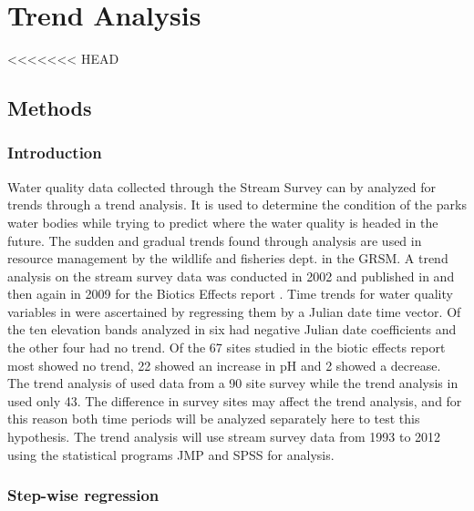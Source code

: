 \chapter{Trend Analysis}\label{ch:TA}
<<<<<<< HEAD

\section{Methods}

\subsection{Introduction}

Water quality data collected through the Stream Survey can by analyzed for trends through a trend analysis.
It is used to determine the condition of the parks water bodies while trying to predict where the water quality is headed in the future. 
The sudden and gradual trends found through analysis are used in resource management by the wildlife and fisheries dept. in the GRSM.
A trend analysis on the stream survey data was conducted in 2002 and published in \citet{robinson2008ph} and then again in 2009 for the Biotics Effects report \citep{cai2012}.
Time trends for water quality variables  in \citet{robinson2008ph} were ascertained by regressing them by a Julian date time vector.
Of the ten elevation bands analyzed in \citet{robinson2008ph} six had negative Julian date coefficients and the other four had no trend. 
Of the 67 sites studied in the biotic effects report most showed no trend, 22 showed an increase in pH and 2 showed a decrease\citep{cai2012}. 
The trend analysis of \citet{robinson2008ph} used data from a 90 site survey while the trend analysis in \citet{cai2012} used only 43.
The difference in survey sites may affect the trend analysis, and for this reason both time periods will be analyzed separately here to test this hypothesis.
The trend analysis will use stream survey data from 1993 to 2012 using the statistical programs JMP and SPSS for analysis.

\subsection{Step-wise regression}

